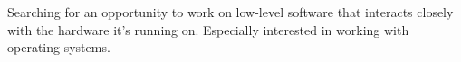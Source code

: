 
\begin{cvparagraph}
Searching for an opportunity to work on low-level software that interacts closely with the hardware it's running on. Especially interested in working with operating systems.
\end{cvparagraph}

